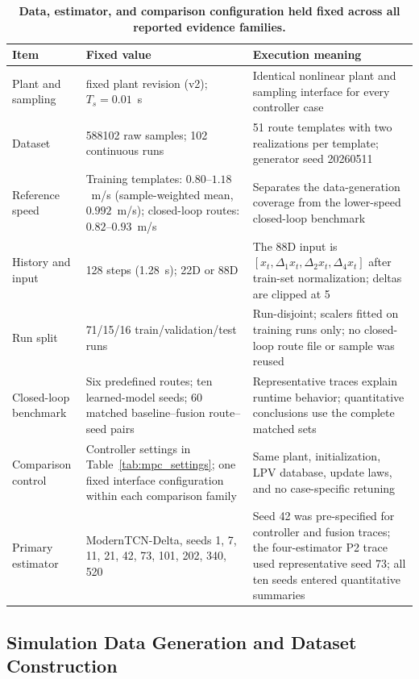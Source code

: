 \documentclass{ieeeaccess}
\begin{document}
\begin{table}[!tbp]
\centering
\caption{\textbf{Data, estimator, and comparison configuration held fixed across all reported evidence families.}}
\label{tab:frozen_experimental_configuration}
\scriptsize
\setlength{\tabcolsep}{3pt}
\begin{tabular}{|p{}|p{}|p{}|}
\hline
Item & Fixed value & Execution meaning \\
\hline
Plant and sampling & fixed plant revision (v2); $T_s=0.01$~s & Identical nonlinear plant and sampling interface for every controller case \\
Dataset & 588102 raw samples; 102 continuous runs & 51 route templates with two realizations per template; generator seed 20260511 \\
Reference speed & Training templates: \mbox{$0.80$--$1.18$~m/s} (sample-weighted mean, $0.992$~m/s); closed-loop routes: \mbox{$0.82$--$0.93$~m/s} & Separates the data-generation coverage from the lower-speed closed-loop benchmark \\
History and input & 128 steps (1.28~s); 22D or 88D & The 88D input is $[x_t,\Delta_1x_t,\Delta_2x_t,\Delta_4x_t]$ after train-set normalization; deltas are clipped at 5 \\
Run split & 71/15/16 train/validation/test runs & Run-disjoint; scalers fitted on training runs only; no closed-loop route file or sample was reused \\
Closed-loop benchmark & Six predefined routes; ten learned-model seeds; 60 matched baseline--fusion route--seed pairs & Representative traces explain runtime behavior; quantitative conclusions use the complete matched sets \\
Comparison control & Controller settings in Table~\ref{tab:mpc_settings}; one fixed interface configuration within each comparison family & Same plant, initialization, LPV database, update laws, and no case-specific retuning \\
Primary estimator & ModernTCN-Delta, seeds 1, 7, 11, 21, 42, 73, 101, 202, 340, 520 & Seed 42 was pre-specified for controller and fusion traces; the four-estimator P2 trace used representative seed 73; all ten seeds entered quantitative summaries \\
\hline
\end{tabular}
\end{table}

\subsection{Simulation Data Generation and Dataset Construction}
\end{document}
